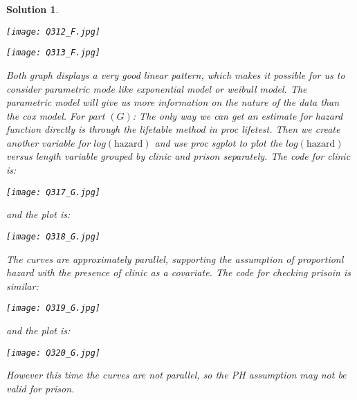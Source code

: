 \documentclass[11pt]{article}
\newtheorem{sol}{Solution}
\begin{document}
\begin{sol}
	\begin{center}
		\texttt{[image: Q312\_F.jpg]}
	\end{center}
	\begin{center}
		\texttt{[image: Q313\_F.jpg]}
	\end{center}
	Both graph displays a very good linear pattern, which makes it possible for us to consider parametric mode like exponential model or weibull model. The parametric model will give us more information on the nature of the data than the cox model.\vskip 2mm
	For part $(G)$:\vskip 2mm
	The only way we can get an estimate for hazard function directly is through the lifetable method in proc lifetest. Then we create another variable for $log(\text{hazard})$ and use proc sgplot to plot the $log(\text{hazard})$ versus length variable grouped by clinic and prison separately.\vskip 2mm
	The code for clinic is:
	\begin{center}
		\texttt{[image: Q317\_G.jpg]}
	\end{center}
	and the plot is:
	\begin{center}
		\texttt{[image: Q318\_G.jpg]}
	\end{center}
	The curves are approximately parallel, supporting the assumption of proportionl hazard with the presence of clinic as a covariate.\vskip 2mm
	The code for checking prisoin is similar:
	\begin{center}
		\texttt{[image: Q319\_G.jpg]}
	\end{center}
	and the plot is:
	\begin{center}
		\texttt{[image: Q320\_G.jpg]}
	\end{center}
	However this time the curves are not parallel, so the PH assumption may not be valid for prison.
\end{sol}
\end{document}
